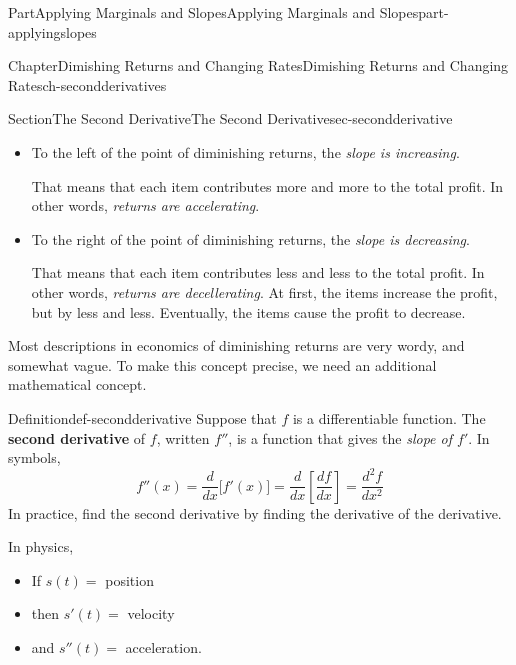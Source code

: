 \documentclass[oneside,10pt,]{tufte-book}
\newcommand{\terminology}[1]{\textbf{#1}}
\numberwithin{equation}{chapter}
\def\drawtikzspline(#1,#2,#3,#4,#5,#6){ \draw[curve,domain=(#1):(#4)] plot (\x , { ( (((#3) + (#6))*(#1) - ((#3) + (#6))*(#4) - 2*(#2) + 2*(#5))/((#1)^3 - 3*((#1)^2)*(#4) + 3*(#1)*((#4)^2) - (#4)^3) )*((\x)^3) + ( -(((#3) + 2*(#6))*((#1)^2) + ((#3) - (#6))*(#1)*(#4) - (2*(#3) + (#6))*((#4)^2) - 3*((#1) + (#4))*(#2) + 3*((#1) + (#4))*(#5))/((#1)^3 - 3*((#1)^2)*(#4) + 3*(#1)*((#4)^2) - (#4)^3) ) *((\x)^2) + ( ((#6)*((#1)^3) + (2*(#3) + (#6))*((#1)^2)*(#4) - ((#3) + 2*(#6))*(#1)*((#4)^2) - (#3)*((#4)^3) - 6*(#1)*(#4)*(#2) + 6*(#1)*(#4)*(#5))/((#1)^3 - 3*((#1)^2)*(#4) + 3*(#1)*((#4)^2) - (#4)^3) ) * (\x) + ( -((#6)*((#1)^3)*(#4) + ((#3) - (#6))*((#1)^2)*(#4)^2 - (#3)*(#1)*((#4)^3) - (3*(#1)*((#4)^2) - (#4)^3)*(#2) - ((#1)^3 - 3*((#1)^2)*(#4))*(#5))/((#1)^3 - 3*((#1)^2)*(#4) + 3*(#1)*((#4)^2) - (#4)^3))}) }
\newcommand{\ddx}[1]{ \dfrac{d}{dx} \Big[ #1 \Big]  }
\newcommand{\ddxfrac}[1]{ \dfrac{d}{dx} \left[ #1 \right]  }
\begin{document}
\begin{partptx}{Part}{Applying Marginals and Slopes}{}{Applying Marginals and Slopes}{}{}{part-applyingslopes}
\begin{chapterptx}{Chapter}{Dimishing Returns and Changing Rates}{}{Dimishing Returns and Changing Rates}{}{}{ch-secondderivatives}
\begin{sectionptx}{Section}{The Second Derivative}{}{The Second Derivative}{}{}{sec-secondderivative}
\begin{image}{0.3}{0.4}{0.3}{}
{
}%
\end{image}%
%
\begin{itemize}[label=\textbullet]
\item{}To the left of the point of diminishing returns, the \emph{slope is increasing}.%
\par
That means that each item contributes more and more to the total profit. In other words, \emph{returns are accelerating}.%
\item{}To the right of the point of diminishing returns, the \emph{slope is decreasing}.%
\par
That means that each item contributes less and less to the total profit. In other words, \emph{returns are decellerating}. At first, the items increase the profit, but by less and less. Eventually, the items cause the profit to decrease.%
\end{itemize}
%
\par
Most descriptions in economics of diminishing returns are very wordy, and somewhat vague. To make this concept precise, we need an additional mathematical concept.%
\begin{definition}{Definition}{}{def-secondderivative}%
Suppose that \(f\) is a differentiable function. The \terminology{second derivative} of \(f\), written \(f''\), is a function that gives the \emph{slope of \(f'\)}.  In symbols,%
\begin{equation*}
f''(x) = \ddx{ f'(x) } = \ddxfrac{\frac{df}{dx} } = \dfrac{d^2f}{dx^2}
\end{equation*}
In practice, find the second derivative by finding the derivative of the derivative.%
\end{definition}
In physics,%
\begin{itemize}[label=\textbullet]
\item{}If \(s(t) = \) position%
\item{}then \(s'(t) = \) velocity%
\item{}and \(s''(t) = \) acceleration.%
\end{itemize}

\end{sectionptx}
\end{chapterptx}
\end{partptx}
\end{document}

